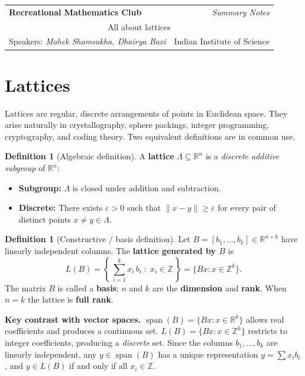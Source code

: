 \documentclass[11pt]{article}
\theoremstyle{plain}
\theoremstyle{definition}
\newtheorem{definition}[theorem]{Definition}
\newcommand{\Z}{\mathbb{Z}}
\newcommand{\R}{\mathbb{R}}
\begin{document}
\noindent
\begin{tabular}{|p{} r|}
\hline
\textbf{Recreational Mathematics Club} & \textit{Summary Notes} \\[4pt]
\multicolumn{2}{|c|}{\Large All about lattices} \\[4pt]
Speakers: \textit{Mahek Shamsukha, Dhairya Baxi} & Indian Institute of Science \\
\hline
\end{tabular}


\section{Lattices}

Lattices are regular, discrete arrangements of points in Euclidean space. They arise naturally in crystallography, sphere packings, integer programming, cryptography, and coding theory. Two equivalent definitions are in common use.

\begin{definition}[Algebraic definition]
A \textbf{lattice} $\Lambda \subseteq \R^n$ is a \emph{discrete additive subgroup} of $\R^n$:
\begin{itemize}
  \item \textbf{Subgroup:} $\Lambda$ is closed under addition and subtraction.
  \item \textbf{Discrete:} There exists $\varepsilon > 0$ such that $\|x - y\| \ge \varepsilon$ for every pair of distinct points $x \ne y \in \Lambda$.
\end{itemize}
\end{definition}

\begin{definition}[Constructive / basis definition]
Let $B = [b_1, \ldots, b_k] \in \R^{n \times k}$ have linearly independent columns.
The \textbf{lattice generated by $B$} is
\[
  L(B) = \left\{\,\sum_{i=1}^{k} x_i\,b_i \;:\; x_i \in \Z\,\right\} = \{Bx : x \in \Z^k\}.
\]
The matrix $B$ is called a \textbf{basis}; $n$ and $k$ are the \textbf{dimension} and \textbf{rank}.
When $n = k$ the lattice is \textbf{full rank}.
\end{definition}

\begin{keybox}
\textbf{Key contrast with vector spaces.}
$\operatorname{span}(B) = \{Bx : x \in \R^k\}$ allows real coefficients and produces a continuous set.
$L(B) = \{Bx : x \in \Z^k\}$ restricts to integer coefficients, producing a \emph{discrete} set.
Since the columns $b_1,\ldots,b_k$ are linearly independent, any $y \in \operatorname{span}(B)$ has a unique representation $y = \sum x_i b_i$, and $y \in L(B)$ if and only if all $x_i \in \Z$.
\end{keybox}
\end{document}
